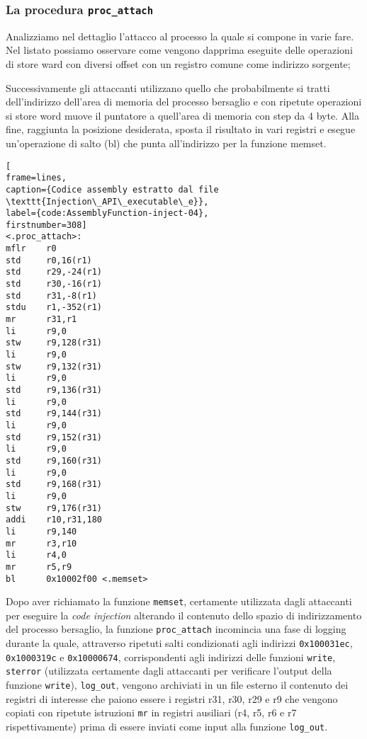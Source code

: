 \documentclass[10pt,a4paper, titlepage]{report}
\begin{document}
\subsubsection{La procedura \texttt{proc\_attach}}

Analizziamo nel dettaglio l'attacco al processo la quale si compone in varie fare.
Nel listato possiamo osservare come vengono dapprima eseguite delle operazioni di store ward con diversi offset con un registro comune come indirizzo sorgente; 

Successivamente gli attaccanti utilizzano quello che probabilmente si tratti dell'indirizzo dell'area di memoria del processo bersaglio e con ripetute operazioni si store word muove il puntatore a quell'area di memoria con step da 4 byte. Alla fine, raggiunta la posizione desiderata, sposta il risultato in vari registri e esegue un'operazione di salto (bl) che punta all'indirizzo per la funzione memset.

\begin{lstlisting}
[
frame=lines, 
caption={Codice assembly estratto dal file \texttt{Injection\_API\_executable\_e}}, 
label={code:AssemblyFunction-inject-04},
firstnumber=308]
<.proc_attach>:
mflr    r0
std     r0,16(r1)
std     r29,-24(r1)
std     r30,-16(r1)
std     r31,-8(r1)
stdu    r1,-352(r1)
mr      r31,r1
li      r9,0
stw     r9,128(r31)
li      r9,0
stw     r9,132(r31)
li      r9,0
std     r9,136(r31)
li      r9,0
std     r9,144(r31)
li      r9,0
std     r9,152(r31)
li      r9,0
std     r9,160(r31)
li      r9,0
std     r9,168(r31)
li      r9,0
stw     r9,176(r31)
addi    r10,r31,180
li      r9,140
mr      r3,r10
li      r4,0
mr      r5,r9
bl      0x10002f00 <.memset>
\end{lstlisting}

Dopo aver richiamato la funzione \texttt{memset}, certamente utilizzata dagli attaccanti per eseguire la \textit{code injection} alterando il contenuto dello spazio di indirizzamento del processo bersaglio, la funzione \texttt{proc\_attach} incomincia una fase di logging durante la quale, attraverso ripetuti salti condizionati agli indirizzi \texttt{0x100031ec}, \texttt{0x1000319c} e \texttt{0x10000674}, corrispondenti agli indirizzi delle funzioni \texttt{write}, \texttt{sterror} (utilizzata certamente dagli attaccanti per verificare l'output della funzione \texttt{write}), \texttt{log\_out}, vengono archiviati in un file esterno il contenuto dei registri di interesse che paiono essere i registri r31, r30, r29 e r9 che vengono copiati con ripetute istruzioni \texttt{mr} in registri ausiliari (r4, r5, r6 e r7 rispettivamente) prima di essere inviati come input alla funzione \texttt{log\_out}.
\end{document}
